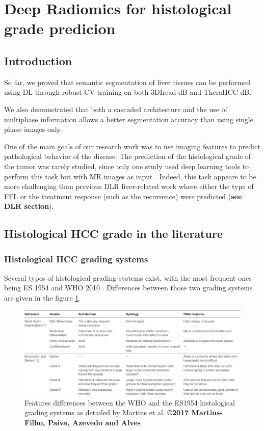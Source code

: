 \documentclass[]{article}
\begin{document}
\section{Deep Radiomics for histological grade predicion}

\subsection{Introduction}\label{introduction}

So far, we proved that semantic segmentation of liver tissues can be
performed using DL through robust CV training on both 3DIrcad-dB and
TheraHCC-dB.

We also demonstrated that both a cascaded architecture and the use of
multiphase information allows a better segmentation accuracy than using
single phase images only.

One of the main goals of our research work was to use imaging features
to predict pathological behavior of the disease. The prediction of the
histological grade of the tumor was rarely studied, since only one study
used deep learning tools to perform this task but with MR images as
input \cite{Yang2019}.
Indeed, this task appears to be more challenging than previous DLR
liver-related work where either the type of FFL or the treatment
response (such as the recurrence) were predicted (\textbf{see DLR section}).

\subsection{Histological HCC grade in the literature
}\label{histological-hcc-grade-in-the-literature}

\subsubsection{Histological HCC grading
systems}\label{histological-hcc-grading-systems}

Several types of histological grading systems exist, with the most
frequent ones being ES 1954 \cite{EdmondsonHA1954}
and WHO 2010 \cite{20113051318}. Differences between those two
grading systems are given in the figure \ref{fig:martins2017_table1}.

\begin{figure}[th!]
\centering
\includegraphics[width=0.9\linewidth]{images/martins2017_table1}
\caption{Features differences between the WHO and the ES1954 histological grading systems as detailed by Martins et al. \cite{Martins2017} \textbf{©2017 Martins-Filho, Paiva, Azevedo and Alves}}
\label{fig:martins2017_table1}
\end{figure}
\end{document}
